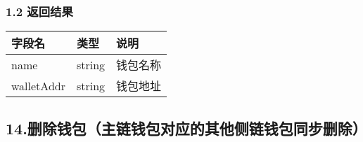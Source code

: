 \documentclass[letterpaper,10pt,english]{sphinxmanual}
\begin{document}
\subsubsection{1.2 返回结果}
\label{\detokenize{BCBWalletSDK_u63a5_u53e3_u8bf4_u660e:id55}}

\begin{sphinxVerbatim}[commandchars=\\\{\}]
     
     
\end{sphinxVerbatim}



\begin{savenotes}\sphinxattablestart
\centering
\begin{tabulary}{\linewidth}[t]{|T|T|T|}
\hline
\sphinxstyletheadfamily 
字段名
&\sphinxstyletheadfamily 
类型
&\sphinxstyletheadfamily 
说明
\\
\hline
name
&
string
&
钱包名称
\\
\hline
walletAddr
&
string
&
钱包地址
\\
\hline
\end{tabulary}
\par
\sphinxattableend\end{savenotes}


\begin{sphinxVerbatim}[commandchars=\\\{\}]
     
\end{sphinxVerbatim}


\subsection{14.删除钱包（主链钱包对应的其他侧链钱包同步删除）}
\label{\detokenize{BCBWalletSDK_u63a5_u53e3_u8bf4_u660e:id56}}
\end{document}
